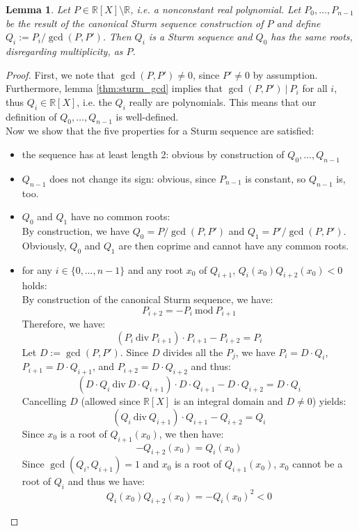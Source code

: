 \documentclass[11pt,a4paper,oneside]{article}
\newtheorem{lemma}[definition]{Lemma}
\newcommand{\RR}{\mathbb{R}}
\begin{document}
\begin{lemma}\label{thm:sturm_multiple_aux}
Let $P\in\RR[X]\setminus\RR$, i.e. a nonconstant real polynomial. Let $P_0,\ldots,P_{n-1}$ be the result of the canonical Sturm sequence construction of $P$ and define $Q_i := P_i / \gcd(P,P')$. Then $Q_i$ is a Sturm sequence and $Q_0$ has the same roots, disregarding multiplicity, as $P$.
\end{lemma}
\begin{proof}
First, we note that $\gcd(P,P')\neq 0$, since $P'\neq 0$ by assumption. Furthermore, lemma \ref{thm:sturm_gcd} implies that $\gcd(P,P')\ |\ P_i$ for all $i$, thus $Q_i\in\RR[X]$, i.e. the $Q_i$ really are polynomials. This means that our definition of $Q_0,\ldots,Q_{n-1}$ is well-defined.\\
Now we show that the five properties for a Sturm sequence are satisfied:
\begin{itemize}
\item the sequence has at least length 2: obvious by construction of $Q_0, \ldots, Q_{n-1}$
\item $Q_{n-1}$ does not change its sign: obvious, since $P_{n-1}$ is constant, so $Q_{n-1}$ is, too.
\item $Q_0$ and $Q_1$ have no common roots:\\
By construction, we have $Q_0 = P / \gcd(P,P')$ and $Q_1 = P' / \gcd(P, P')$. Obviously, $Q_0$ and $Q_1$ are then coprime and cannot have any common roots.
\item for any $i\in\{0,\ldots,n-1\}$ and any root $x_0$ of $Q_{i+1}$, $Q_{i}(x_0)Q_{i+2}(x_0) < 0$ holds:\\
By construction of the canonical Sturm sequence, we have:
$$P_{i+2} = -P_{i}\ \mathrm{mod}\ P_{i+1}$$
Therefore, we have:
$$(P_{i}\ \mathrm{div}\ P_{i+1}) \cdot P_{i+1} - P_{i+2} = P_{i}$$
Let $D:=\gcd(P,P')$. Since $D$ divides all the $P_j$, we have $P_{i}=D\cdot Q_{i}$, $P_{i+1}=D\cdot Q_{i+1}$, and $P_{i+2}=D\cdot Q_{i+2}$ and thus:
$$(D\cdot Q_{i}\ \mathrm{div}\ D\cdot Q_{i+1}) \cdot D\cdot Q_{i+1} - D\cdot Q_{i+2} = D\cdot Q_{i}$$
Cancelling $D$ (allowed since $\RR[X]$ is an integral domain and $D\neq 0$) yields:
$$(Q_{i}\ \mathrm{div}\ Q_{i+1}) \cdot Q_{i+1} - Q_{i+2} = Q_{i}$$
Since $x_0$ is a root of $Q_{i+1}(x_0)$, we then have:
$$-Q_{i+2}(x_0) = Q_{i}(x_0)$$
Since $\gcd(Q_{i}, Q_{i+1}) = 1$ and $x_0$ is a root of $Q_{i+1}(x_0)$, $x_0$ cannot be a root of $Q_{i}$ and thus we have:
$$Q_{i}(x_0)Q_{i+2}(x_0) = -Q_{i}(x_0)^2 < 0$$


\end{itemize}
\end{proof}
\end{document}
